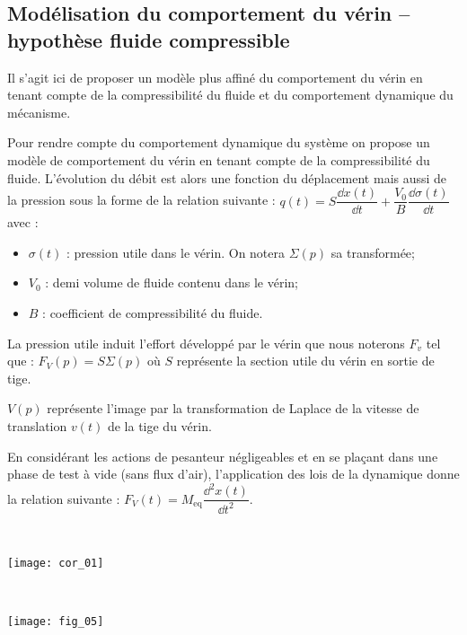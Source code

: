 \subsection*{Modélisation du comportement du vérin -- hypothèse fluide compressible}
\ifprof
\else

\begin{obj}
Il s'agit ici de proposer un modèle plus affiné du comportement du vérin en tenant compte de la compressibilité du fluide et du comportement dynamique du mécanisme.
\end{obj}		



Pour rendre compte du comportement dynamique du système on propose un modèle de comportement du vérin en tenant compte de la compressibilité du fluide. L'évolution du débit est alors une fonction du déplacement mais aussi de la pression sous la forme de la relation suivante : $q(t)=S\dfrac{\dd x(t)}{\dd t}+\dfrac{V_0}{B}\dfrac{\dd \sigma(t)}{\dd t}$ avec : 
\begin{itemize}
\item $\sigma(t)$ : pression utile dans le vérin. On notera $\Sigma(p)$ sa transformée;
\item $V_0$ : demi volume de fluide contenu dans le vérin;
\item $B$ : coefficient de compressibilité du fluide.
\end{itemize}  

La pression utile induit l'effort développé par le vérin que nous noterons $F_v$ tel que : $F_V(p)=S\Sigma(p)$ où $S$ représente la section utile du vérin en sortie de tige.

$V(p)$ représente l'image par la transformation de Laplace de la vitesse de translation $v(t)$ de la tige du vérin. 

En considérant les actions de pesanteur négligeables et en se plaçant dans une phase de test à vide (sans flux d'air), l'application des lois de la dynamique donne la relation suivante : $F_V(t)=M_{\text{eq}} \dfrac{\dd^2 x(t)}{\dd t^2}$.

\fi 

\ifprof
\begin{corrige} ~\\
\begin{center}
\texttt{[image: cor\_01]}
\end{center}

\end{corrige}
\else
\
\begin{center}
\texttt{[image: fig\_05]}
\end{center}

